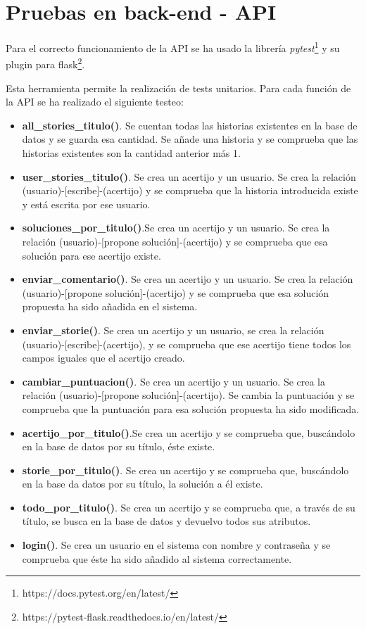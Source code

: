 \section{Pruebas en back-end - API}

Para el correcto funcionamiento de la API se ha usado la librería \textit{pytest}\footnote{https://docs.pytest.org/en/latest/} y su plugin para flask\footnote{https://pytest-flask.readthedocs.io/en/latest/}.

Esta herramienta permite la realización de tests unitarios. Para cada función de la API se ha realizado el siguiente testeo:

\begin{itemize}
    \item \textbf{all\_stories\_titulo()}. Se cuentan todas las historias existentes en la base de datos y se guarda esa cantidad. Se añade una historia y se comprueba que las historias existentes son la cantidad anterior más 1.
     \item \textbf{user\_stories\_titulo()}. Se crea un acertijo y un usuario. Se crea la relación (usuario)-[escribe]-(acertijo) y se comprueba que la historia introducida existe y está escrita por ese usuario.
     \item \textbf{soluciones\_por\_titulo()}.Se crea un acertijo y un usuario. Se crea la relación (usuario)-[propone solución]-(acertijo) y se comprueba que esa solución para ese acertijo existe.
     \item \textbf{enviar\_comentario()}. Se crea un acertijo y un usuario. Se crea la relación (usuario)-[propone solución]-(acertijo) y se comprueba que esa solución propuesta ha sido añadida en el sistema.
     \item \textbf{enviar\_storie()}. Se crea un acertijo y un usuario, se crea la relación (usuario)-[escribe]-(acertijo), y se comprueba que ese acertijo tiene todos los campos iguales que el acertijo creado.
     \item \textbf{cambiar\_puntuacion()}. Se crea un acertijo y un usuario. Se crea la relación (usuario)-[propone solución]-(acertijo). Se cambia la puntuación y se comprueba que la puntuación para esa solución propuesta ha sido modificada.
     \item \textbf{acertijo\_por\_titulo()}.Se crea un acertijo y se comprueba que, buscándolo en la base de datos por su título, éste existe.
     \item \textbf{storie\_por\_titulo()}. Se crea un acertijo y se comprueba que, buscándolo en la base da datos por su título, la solución a él existe.
     \item \textbf{todo\_por\_titulo()}. Se crea un acertijo y se comprueba que, a través de su título, se busca en la base de datos y devuelvo todos sus atributos.
     \item \textbf{login()}. Se crea un usuario en el sistema con nombre y contraseña y se comprueba que éste ha sido añadido al sistema correctamente.
\end{itemize}

